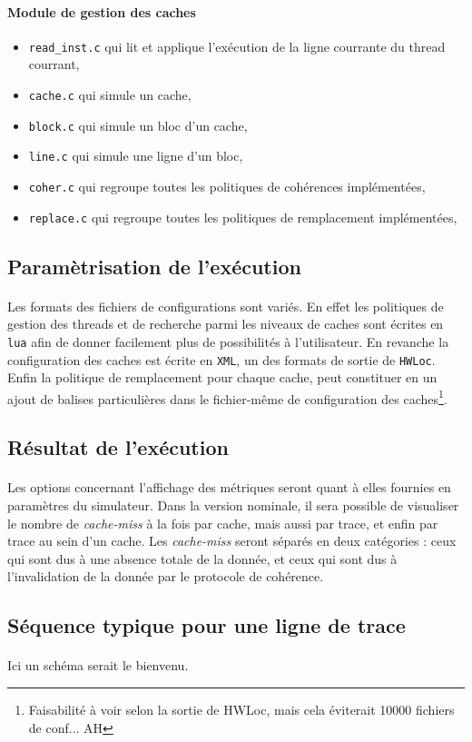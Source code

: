 \paragraph{Module de gestion des caches}
\begin{itemize}
\item{\verb!read_inst.c! qui lit et applique l'exécution de la ligne courrante du thread courrant,}
\item{\verb!cache.c! qui simule un cache,}
\item{\verb!block.c! qui simule un bloc d'un cache,}
\item{\verb!line.c! qui simule une ligne d'un bloc,}
\item{\verb!coher.c! qui regroupe toutes les politiques de cohérences implémentées,}
\item{\verb!replace.c! qui regroupe toutes les politiques de remplacement implémentées,}
\end{itemize}

\subsection{Paramètrisation de l'exécution}

\paragraph{}
Les formats des fichiers de configurations sont variés. En effet les politiques de gestion des threads et de recherche parmi les niveaux de caches sont écrites en \texttt{lua} afin de donner facilement plus de possibilités à l'utilisateur. En revanche la configuration des caches est écrite en \texttt{XML}, un des formats de sortie de \texttt{HWLoc}. Enfin la politique de remplacement pour chaque cache, peut constituer en un ajout de balises particulières dans le fichier-même de configuration des caches\footnote{Faisabilité à voir selon la sortie de HWLoc, mais cela éviterait 10000 fichiers de conf... AH}.


\subsection{Résultat de l'exécution}

\paragraph{}
Les options concernant l'affichage des métriques seront quant à elles fournies en paramètres du simulateur. Dans la version nominale, il sera possible de visualiser le nombre de \emph{cache-miss} à la fois par cache, mais aussi par trace, et enfin par trace au sein d'un cache. Les \emph{cache-miss} seront séparés en deux catégories : ceux qui sont dus à une absence totale de la donnée, et ceux qui sont dus à l'invalidation de la donnée par le protocole de cohérence.

\subsection{Séquence typique pour une ligne de trace}

\paragraph{}
Ici un schéma serait le bienvenu.


